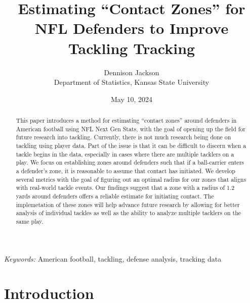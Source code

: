 \documentclass[
  12pt]{article}
\begin{document}
\def\spacingset#1{\renewcommand{\baselinestretch}%
{#1}\small\normalsize} \spacingset{1}



\date{May 10, 2024}
\title{\bf Estimating ``Contact Zones'' for NFL Defenders to Improve
Tackling Tracking}
\author{
Dennison Jackson\\
Department of Statistics, Kansas State University\\
}
\maketitle

\bigskip
\bigskip
\begin{abstract}
This paper introduces a method for estimating ``contact zones'' around
defenders in American football using NFL Next Gen Stats, with the goal
of opening up the field for future research into tackling. Currently,
there is not much research being done on tackling using player data.
Part of the issue is that it can be difficult to discern when a tackle
begins in the data, especially in cases where there are multiple
tacklers on a play. We focus on establishing zones around defenders such
that if a ball-carrier enters a defender's zone, it is reasonable to
assume that contact has initiated. We develop several metrics with the
goal of figuring out an optimal radius for our zones that aligns with
real-world tackle events. Our findings suggest that a zone with a radius
of 1.2 yards around defenders offers a reliable estimate for initiating
contact. The implemetation of these zones will help advance future
research by allowing for better analysis of individual tackles as well
as the ability to analyze multiple tacklers on the same play.
\end{abstract}

\noindent%
{\it Keywords:} American football, tackling, defense analysis, tracking
data
\vfill

\newpage
\spacingset{1.9} %

\section{Introduction}\label{introduction}
\end{document}
